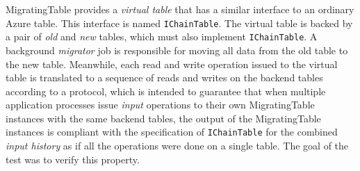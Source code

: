 MigratingTable provides a \emph{virtual table} that has a similar interface to an ordinary Azure table. This interface is named \texttt{IChainTable}. The virtual table is backed by a pair of \emph{old} and \emph{new} tables, which must also implement \texttt{IChainTable}. A background \emph{migrator} job is responsible for moving all data from the old table to the new table. Meanwhile, each read and write operation issued to the virtual table is translated to a sequence of reads and writes on the backend tables according to a protocol, which is intended to guarantee that when multiple application processes issue \emph{input} operations to their own MigratingTable instances with the same backend tables, the output of the MigratingTable instances is compliant with the specification of \texttt{IChainTable} for the combined \emph{input history} as if all the operations were done on a single table. The goal of the \psharp test was to verify this property.




